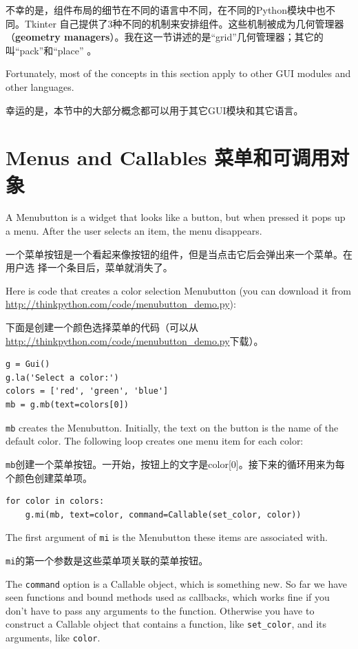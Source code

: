 \documentclass[10pt]{book}
\begin{document}
\begin{CJK}{UTF8}{gbsn}
不幸的是，组件布局的细节在不同的语言中不同，在不同的Python模块中也不同。Tkinter
自己提供了3种不同的机制来安排组件。这些机制被成为几何管理器（{\bf geometry
managers}）。我在这一节讲述的是``grid''几何管理器；其它的叫``pack''和``place''
。

Fortunately, most of the concepts in this section apply to
other GUI modules and other languages.

幸运的是，本节中的大部分概念都可以用于其它GUI模块和其它语言。

\section{Menus and Callables 菜单和可调用对象}

A Menubutton is a widget that looks like a button, but when pressed
it pops up a menu.  After the user selects an item, the menu
disappears.

一个菜单按钮是一个看起来像按钮的组件，但是当点击它后会弹出来一个菜单。在用户选
择一个条目后，菜单就消失了。

Here is code that creates a color selection Menubutton
(you can download it from \url{http://thinkpython.com/code/menubutton_demo.py}):

下面是创建一个颜色选择菜单的代码（可以从
\url{http://thinkpython.com/code/menubutton_demo.py}下载）。

\begin{verbatim}
g = Gui()
g.la('Select a color:')
colors = ['red', 'green', 'blue']
mb = g.mb(text=colors[0])
\end{verbatim}
%
{\tt mb} creates the Menubutton.  Initially, the text on the button is
the name of the default color.  The following loop creates one menu
item for each color:

{\tt mb}创建一个菜单按钮。一开始，按钮上的文字是color[0]。接下来的循环用来为每
个颜色创建菜单项。

\begin{verbatim}
for color in colors:
    g.mi(mb, text=color, command=Callable(set_color, color))
\end{verbatim}
%
The first argument of {\tt mi} is the Menubutton these items are
associated with.

{\tt mi}的第一个参数是这些菜单项关联的菜单按钮。

The {\tt command} option is a Callable object, which is something new.
So far we have seen functions and bound methods used as callbacks,
which works fine if you don't have to pass any arguments to
the function.  Otherwise you have to construct a Callable object
that contains a function, like \verb"set_color", and its arguments,
like {\tt color}.


\end{CJK}
\end{document}
